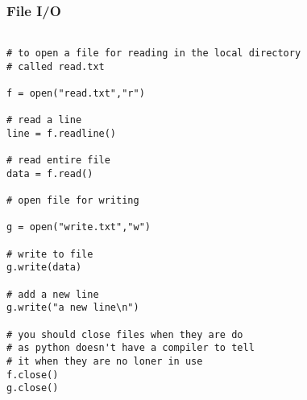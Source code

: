 \documentclass[11pt,a4paper]{article}
\begin{document}
\subsubsection{File I/O}
\begin{verbatim}

# to open a file for reading in the local directory
# called read.txt

f = open("read.txt","r")

# read a line
line = f.readline()

# read entire file
data = f.read()

# open file for writing

g = open("write.txt","w")

# write to file
g.write(data)

# add a new line
g.write("a new line\n")

# you should close files when they are do
# as python doesn't have a compiler to tell
# it when they are no loner in use
f.close()
g.close()

\end{verbatim}
\end{document}
